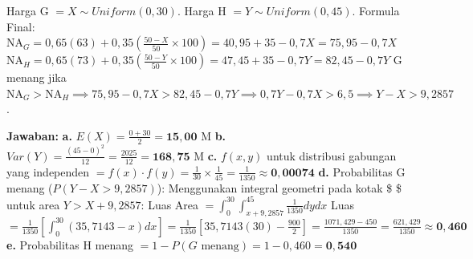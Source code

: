 \documentclass[
  letterpaper,
  DIV=11,
  numbers=noendperiod]{scrartcl}
\begin{document}
Harga G \(= X \sim Uniform(0, 30)\). Harga H
\(= Y \sim Uniform(0, 45)\). Formula Final:
\(\text{NA}_G = 0,65(63) + 0,35 \left( \frac{50-X}{50} \times 100 \right) = 40,95 + 35 - 0,7X = 75,95 - 0,7X\)
\(\text{NA}_H = 0,65(73) + 0,35 \left( \frac{50-Y}{50} \times 100 \right) = 47,45 + 35 - 0,7Y = 82,45 - 0,7Y\)
G menang jika
\(\text{NA}_G > \text{NA}_H \implies 75,95 - 0,7X > 82,45 - 0,7Y \implies 0,7Y - 0,7X > 6,5 \implies Y - X > 9,2857\).

\textbf{Jawaban:} \textbf{a.}
\(E(X) = \frac{0 + 30}{2} = \mathbf{15,00}\) M \textbf{b.}
\(Var(Y) = \frac{(45 - 0)^2}{12} = \frac{2025}{12} = \mathbf{168,75}\) M
\textbf{c.} \(f(x,y)\) untuk distribusi gabungan yang independen
\(= f(x) \cdot f(y) = \frac{1}{30} \times \frac{1}{45} = \frac{1}{1350} \approx \mathbf{0,00074}\)
\textbf{d.} Probabilitas G menang (\(P(Y - X > 9,2857)\)): Menggunakan
integral geometri pada kotak \$ \times \$ untuk area \(Y > X + 9,2857\):
Luas Area \(= \int_{0}^{30} \int_{x+9,2857}^{45} \frac{1}{1350} dy dx\)
Luas
\(= \frac{1}{1350} \left[ \int_{0}^{30} (35,7143 - x) dx \right] = \frac{1}{1350} \left[ 35,7143(30) - \frac{900}{2} \right] = \frac{1071,429 - 450}{1350} = \frac{621,429}{1350} \approx \mathbf{0,460}\)
\textbf{e.} Probabilitas H menang
\(= 1 - P(G \text{ menang}) = 1 - 0,460 = \mathbf{0,540}\)
\end{document}
